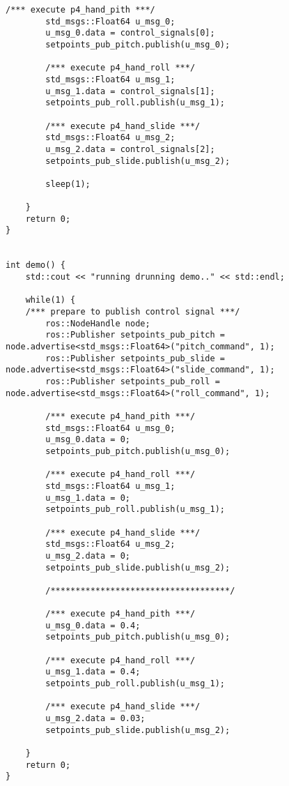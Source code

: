 \begin{lstlisting}[language=gedit]
        /*** execute p4_hand_pith ***/
        std_msgs::Float64 u_msg_0;
        u_msg_0.data = control_signals[0];
        setpoints_pub_pitch.publish(u_msg_0);

        /*** execute p4_hand_roll ***/
        std_msgs::Float64 u_msg_1;
        u_msg_1.data = control_signals[1];
        setpoints_pub_roll.publish(u_msg_1);

        /*** execute p4_hand_slide ***/
        std_msgs::Float64 u_msg_2;
        u_msg_2.data = control_signals[2];
        setpoints_pub_slide.publish(u_msg_2);
        
        sleep(1);
 
    }
    return 0;
}


int demo() {
    std::cout << "running drunning demo.." << std::endl;
 
    while(1) {
    /*** prepare to publish control signal ***/ 
        ros::NodeHandle node;
        ros::Publisher setpoints_pub_pitch = node.advertise<std_msgs::Float64>("pitch_command", 1);
        ros::Publisher setpoints_pub_slide = node.advertise<std_msgs::Float64>("slide_command", 1);
        ros::Publisher setpoints_pub_roll = node.advertise<std_msgs::Float64>("roll_command", 1);

        /*** execute p4_hand_pith ***/
        std_msgs::Float64 u_msg_0;
        u_msg_0.data = 0;
        setpoints_pub_pitch.publish(u_msg_0);

        /*** execute p4_hand_roll ***/
        std_msgs::Float64 u_msg_1;
        u_msg_1.data = 0;
        setpoints_pub_roll.publish(u_msg_1);

        /*** execute p4_hand_slide ***/
        std_msgs::Float64 u_msg_2;
        u_msg_2.data = 0;
        setpoints_pub_slide.publish(u_msg_2);

        /************************************/

        /*** execute p4_hand_pith ***/
        u_msg_0.data = 0.4;
        setpoints_pub_pitch.publish(u_msg_0);

        /*** execute p4_hand_roll ***/
        u_msg_1.data = 0.4;
        setpoints_pub_roll.publish(u_msg_1);

        /*** execute p4_hand_slide ***/
        u_msg_2.data = 0.03;
        setpoints_pub_slide.publish(u_msg_2);

    }
    return 0;
}
\end{lstlisting}